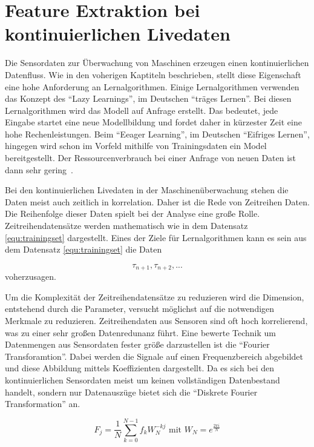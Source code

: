 \section{Feature Extraktion bei kontinuierlichen Livedaten}\label{kap:featureextraktion}

Die Sensordaten zur Überwachung von Maschinen erzeugen einen kontinuierlichen Datenfluss. Wie in den voherigen Kaptiteln beschrieben, stellt diese Eigenschaft eine hohe Anforderung an Lernalgorithmen. Einige Lernalgorithmen verwenden das Konzept des \enquote{Lazy Learnings}, im Deutschen \enquote{träges Lernen}. Bei diesen Lernalgorithmen wird das Modell auf Anfrage erstellt. Das bedeutet, jede Eingabe startet eine neue Modellbildung und fordet daher in kürzester Zeit eine hohe Rechenleistungen. Beim \enquote{Eeager Learning}, im Deutschen \enquote{Eifriges Lernen}, hingegen wird schon im Vorfeld mithilfe von Trainingsdaten ein Model bereitgestellt. Der Ressourcenverbrauch bei einer Anfrage von neuen Daten ist dann sehr gering~\cite{Gay2013}. 

Bei den kontinuierlichen Livedaten in der Maschinenüberwachung stehen die Daten meist auch zeitlich in korrelation. Daher ist die Rede von Zeitreihen Daten. Die Reihenfolge dieser Daten spielt bei der Analyse eine große Rolle. Zeitreihendatensätze werden mathematisch wie in dem Datensatz \ref{equ:trainingset} dargestellt. Eines der Ziele für Lernalgorithmen kann es sein aus dem Datensatz \ref{equ:trainingset} die Daten 

\begin{equation}
  \tau_{n+1}, \tau_{n+2}, ...
  \label{equ:predictionset}
\end{equation}
voherzusagen.

Um die Komplexität der Zeitreihendatensätze zu reduzieren wird die Dimension, entstehend durch die Parameter, versucht möglichst auf die notwendigen Merkmale zu reduzieren. Zeitreihendaten aus Sensoren sind oft hoch korrelierend, was zu einer sehr großen Datenredunanz führt. 
Eine bewerte Technik um Datenmengen aus Sensordaten fester größe darzustellen ist die \enquote{Fourier Transforamtion}. Dabei werden die Signale auf einen Frequenzbereich abgebildet und diese Abbildung mittels Koeffizienten dargestellt. Da es sich bei den kontinuierlichen Sensordaten meist um keinen vollständigen Datenbestand handelt, sondern nur Datenauszüge bietet sich die \enquote{Diskrete Fourier Transformation} an.

\begin{equation}
  F_j = \frac{1}{N} \sum_{k=0}^{N-1} f_k W_N^{-kj}  \text{\ \ mit \ \ } W_N = e^{\frac{2\pi i}{N}}
  \label{equ:fourier}
\end{equation}

